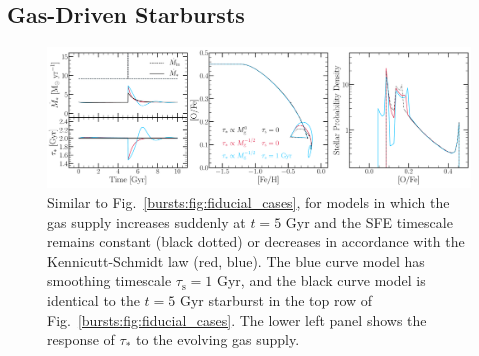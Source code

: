 \subsection{Gas-Driven Starbursts}
\label{bursts:sec:gas-driven}

\begin{figure} %
\includegraphics[scale = 0.31]{schmidt_smoothing.pdf}
\caption{
Similar to Fig.~\ref{bursts:fig:fiducial_cases}, for models in which the gas supply 
increases suddenly at $t = 5$ Gyr and the SFE timescale remains constant 
(black dotted) or decreases in accordance with the Kennicutt-Schmidt law (red, 
blue). The blue curve model has smoothing timescale $\tau_\text{s} = 1$ Gyr, 
and the black curve model is identical to the $t = 5$ Gyr starburst in the top 
row of Fig.~\ref{bursts:fig:fiducial_cases}. The lower left panel shows the response 
of $\tau_*$ to the evolving gas supply. 
}
\label{bursts:fig:ts_bolus_schmidt}
\end{figure}


